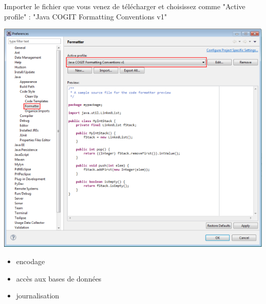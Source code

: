 Importer le fichier que vous venez de télécharger et choisissez comme "Active profile" : "Java COGIT Formatting Conventions v1" 

\begin{center}
\includegraphics[width=0.5\linewidth]{../../resources/images/guide_installation/ConfigEclipseConventionCodage_2.png}
\end{center}


\begin{itemize}[leftmargin=* ,parsep=0cm,itemsep=0cm,topsep=0cm]
\item encodage
\item accès aux bases de données
\item journalisation
\end{itemize}
